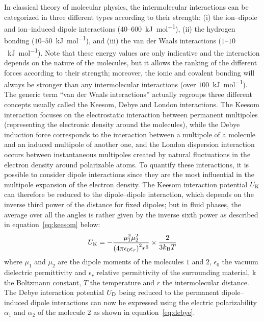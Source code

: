 \documentclass[main.tex]{subfiles}
\begin{document}
In classical theory of molecular physics, the intermolecular interactions can be categorized in three different types according to their strength: (i) the ion--dipole and ion--induced dipole interactions ($40$--$600$~\si{\kilo\joule\per\mol}), (ii) the hydrogen bonding ($10$--$50$~\si{\kilo\joule\per\mol}), and (iii) the van der Waals interactions ($1$--$10$~\si{\kilo\joule\per\mol}). Note that these energy values are only indicative and the interaction depends on the nature of the molecules, but it allows the ranking of the different forces according to their strength; moreover, the ionic and covalent bonding will always be stronger than any intermolecular interactions (over $100$~\si{\kilo\joule\per\mol}). The generic term ``van der Waals interactions'' actually regroups three different concepts usually called the Keesom, Debye and London interactions. The Keesom interaction focuses on the electrostatic interaction between permanent multipoles (representing the electronic density around the molecules),\autocite{keesom1915second} while the Debye induction force corresponds to the interaction between a multipole of a molecule and an induced multipole of another one,\autocite{Roberts_1938} and the London dispersion interaction occurs between instantaneous multipoles created by natural fluctuations in the electron density around polarizable atoms.\autocite{london1930theorie,polanyi1932section} To quantify these interactions, it is possible to consider dipole interactions since they are the most influential in the multipole expansion of the electron density. The Keesom interaction potential $U_{\text{K}}$ can therefore be reduced to the dipole--dipole interaction, which depends on the inverse third power of the distance for fixed dipoles; but in fluid phases, the average over all the angles is rather given by the inverse sixth power as described in equation~\ref{eq:keesom} below:
\begin{equation}\label{eq:keesom}
  U_{\text{K}} = -\dfrac{\mu_1^2\mu_2^2}{{(4\pi\epsilon_0\epsilon_r)}^2r^6}\times\dfrac{2}{ 3k_{\text{B}}T}
\end{equation}
where $\mu_1$ and $\mu_2$ are the dipole moments of the molecules $1$ and $2$, $\epsilon_0$ the vacuum dielectric permittivity and $\epsilon_r$ relative permittivity of the surrounding material, k the Boltzmann constant, $T$ the temperature and $r$ the intermolecular distance. The Debye interaction potential $U_{\text{D}}$ being reduced to the permanent dipole--induced dipole interactions can now be expressed using the electric polarizability $\alpha_1$ and $\alpha_2$ of the molecule $2$ as shown in equation~\ref{eq:debye}.
\end{document}
